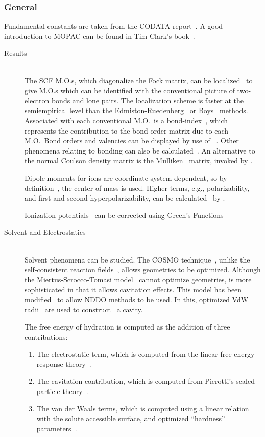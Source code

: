 \subsubsection*{General}
Fundamental constants are taken from the CODATA report~\cite{codata}.
A good introduction to MOPAC can be found in Tim Clark's book~\cite{tclark}.
\begin{description}
\item[Results]~\\
The SCF M.O.s, which diagonalize the Fock matrix, can be localized~\cite{local}
to give M.O.s which can be identified with the conventional picture of
two-electron bonds and lone pairs. The localization scheme is faster at the
semiempirical level than the Edmiston-Ruedenberg~\cite{edmrue} or
Boys~\cite{boys} methods.  Associated with each conventional M.O.\ is a
bond-index~\cite{m.o.valency}, which represents the contribution to  the
bond-order matrix due to each M.O.\ Bond orders and valencies can be displayed
by use of ~\cite{bonds}. Other phenomena relating to bonding can
also be calculated~\cite{nrm85,mrb86,mb89}.  An alternative to the normal
Coulson density matrix is the Mulliken~\cite{mullik1,mullik2} matrix, invoked
by .

Dipole moments for ions are coordinate system dependent, so by
definition~\cite{dipoles_for_ions}, the center of
mass is used. Higher terms, e.g., polarizability, and first and second
hyperpolarizability, can be calculated~\cite{polar} by .

Ionization potentials~\cite{koopmans} can be corrected using Green's
Functions~\cite{gf1,gf2,gf3,gf4,gf5,gf6}

\item[Solvent and Electrostatics]~\\
Solvent phenomena can be studied.  The COSMO technique~\cite{cosmo}, unlike the
self-consistent reaction fields~\cite{scrf}, allows  geometries to be
optimized. Although the Miertus-Scrocco-Tomasi model~\cite{mst,mt} cannot
optimize geometries, is more sophisticated in that it allows cavitation
effects.  This model has been modified~\cite{lno,glo,nol,lbo,obl}  to  allow
NDDO methods to be used. In this, optimized VdW radii~\cite{ojl,blo} are used
to construct~\cite{pastb} a cavity.

The free energy of hydration is computed as the addition of three
contributions:

\begin{enumerate}
\item The electrostatic term, which is computed from the linear free energy
response theory~\cite{mst,mt,lno,glo,nol,lbo,obl}.
\item The cavitation contribution, which is computed from Pierotti's scaled
particle theory~\cite{rap}.
\item The van der Waals terms, which is computed using a linear relation with
the solute accessible surface, and optimized ``hardness''
parameters~\cite{ojl,blo}.
\end{enumerate}


\end{description}
